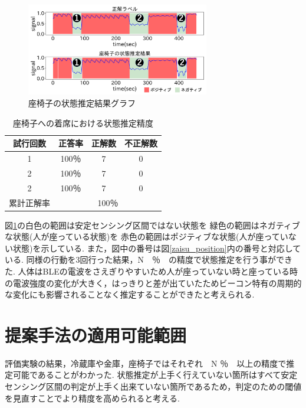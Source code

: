 \documentclass[Japanese]{dicomopapers}
\begin{document}
\begin{figure}[h]
    \centering
    \includegraphics[width=8cm]{zaisu_graph.png}
    \caption{座椅子の状態推定結果グラフ}
    \label{chair_graph}
\end{figure}


\begin{table}[h]
    \begin{center}
        \caption{座椅子への着席における状態推定精度}
        \label{chair_fig}
        \begin{tabular}{|c|c|c|c|} \hline
        試行回数 & 正答率 & 正解数 & 不正解数 \\ \hline
        1 & 100％ & 7 & 0 \\ \hline
        2 & 100％ & 7 & 0 \\ \hline
        2 & 100％ & 7 & 0 \\ \hline \hline
        累計正解率 & \multicolumn{3}{c|}{100％} \\ \hline
        \end{tabular}
    \end{center}
\end{table}


図\ref{chair_graph}の白色の範囲は安定センシング区間ではない状態を 緑色の範囲はネガティブな状態(人が座っている状態)を 赤色の範囲はポジティブな状態(人が座っていない状態)を示している.
また，図中の番号は図\ref{zaisu_position}内の番号と対応している.
同様の行動を3回行った結果，N　％　の精度で状態推定を行う事ができた.
人体はBLEの電波をさえぎりやすいため人が座っていない時と座っている時の電波強度の変化が大きく，はっきりと差が出ていたためビーコン特有の周期的な変化にも影響されることなく推定することができたと考えられる.




\section{提案手法の適用可能範囲}
評価実験の結果，冷蔵庫や金庫，座椅子ではそれぞれ　N ％　以上の精度で推定可能であることがわかった.
状態推定が上手く行えていない箇所はすべて安定センシング区間の判定が上手く出来ていない箇所であるため，判定のための閾値を見直すことでより精度を高められると考える.
\end{document}
